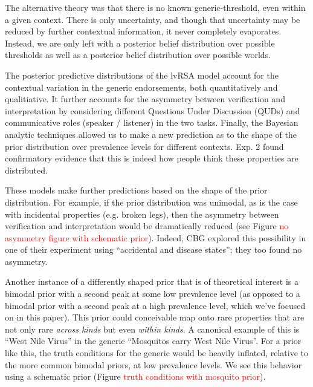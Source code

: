 \documentclass[10pt,letterpaper]{article}
\newcommand{\red}[1]{\textcolor{Red}{#1}}
\begin{document}
The alternative theory was that there is no known generic-threshold, even within a given context. There is only uncertainty, and though that uncertainty may be reduced by further contextual information, it never completely evaporates. Instead, we are only left with a posterior belief distribution over possible thresholds as well as a posterior belief distribution over possible worlds. 

The posterior predictive distributions of the lvRSA model account for the contextual variation in the generic endorsements, both quantitatively and qualitiative. It further accounts for the asymmetry between verification and interpretation by considering different Questions Under Discussion (QUDs) and communicative roles (speaker / listener) in the two tasks. Finally, the Bayesian analytic techniques allowed us to make a new prediction as to the shape of the prior distribution over prevalence levels for different contexts. Exp. 2 found confirmatory evidence that this is indeed how people think these properties are distributed.

%
 

These models make further predictions based on the shape of the prior distribution. For example, if the prior distribution was unimodal, as is the case with incidental properties (e.g. broken legs), then the asymmetry between verification and interpretation would be dramatically reduced (see Figure \red{no asymmetry figure with schematic prior}). Indeed, CBG explored this possibility in one of their experiment using ``accidental and disease states''; they too found no asymmetry. 

Another instance of a differently shaped prior that is of theoretical interest is a bimodal prior with a second peak at some low prevalence level (as opposed to a bimodal prior with a second peak at a high prevalence level, which we've focused on in this paper). This prior could conceivable map onto rare properties that are not only rare \emph{across kinds} but even \emph{within kinds}. A canonical example of this is ``West Nile Virus'' in the generic ``Mosquitos carry West Nile Virus''. For a prior like this, the truth conditions for the generic would be heavily inflated, relative to the more common bimodal priors, at low prevalence levels. We see this behavior using a schematic prior (Figure \red{truth conditions with mosquito prior}). 
\end{document}

